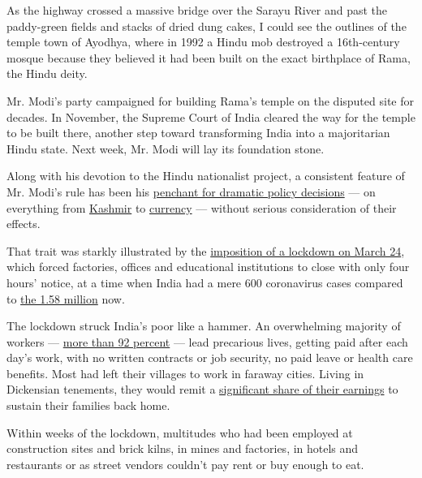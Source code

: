 As the highway crossed a massive bridge over the Sarayu River and past
the paddy-green fields and stacks of dried dung cakes, I could see the
outlines of the temple town of Ayodhya, where in 1992 a Hindu mob
destroyed a 16th-century mosque because they believed it had been built
on the exact birthplace of Rama, the Hindu deity.

Mr. Modi's party campaigned for building Rama's temple on the disputed
site for decades. In November, the Supreme Court of India cleared the
way for the temple to be built there, another step toward transforming
India into a majoritarian Hindu state. Next week, Mr. Modi will lay its
foundation stone.

Along with his devotion to the Hindu nationalist project, a consistent
feature of Mr. Modi's rule has been his
\href{https://www.nytimes.com/2020/05/27/opinion/india-modi-coronavirus.html}{penchant
for dramatic policy decisions} --- on everything from
\href{https://www.nytimes.com/2019/08/15/opinion/sunday/kashmir-siege-modi.html}{Kashmir}
to
\href{https://www.nytimes.com/2016/11/27/opinion/in-india-black-money-makes-for-bad-policy.html}{currency}
--- without serious consideration of their effects.

That trait was starkly illustrated by the
\href{https://www.nytimes.com/2020/03/25/opinion/india-coronavirus-lockdown.html}{imposition
of a lockdown on March 24}, which forced factories, offices and
educational institutions to close with only four hours' notice, at a
time when India had a mere 600 coronavirus cases compared to
\href{https://www.ndtv.com/india-news/coronavirus-over-50-000-cases-in-india-in-24-hours-for-the-first-time-15-83-lakh-total-cases-so-far-over-10-lakh-recoveries-2271144}{the
1.58 million} now.

The lockdown struck India's poor like a hammer. An overwhelming majority
of workers ---
\href{https://www.magzter.com/article/Business/Forbes-India/Work-In-Progress}{more
than 92 percent} --- lead precarious lives, getting paid after each
day's work, with no written contracts or job security, no paid leave or
health care benefits. Most had left their villages to work in faraway
cities. Living in Dickensian tenements, they would remit a
\href{https://www.livemint.com/news/india/why-india-s-migrants-deserve-a-better-deal-11589818749274.html}{significant
share of their earnings} to sustain their families back home.

Within weeks of the lockdown, multitudes who had been employed at
construction sites and brick kilns, in mines and factories, in hotels
and restaurants or as street vendors couldn't pay rent or buy enough to
eat.

